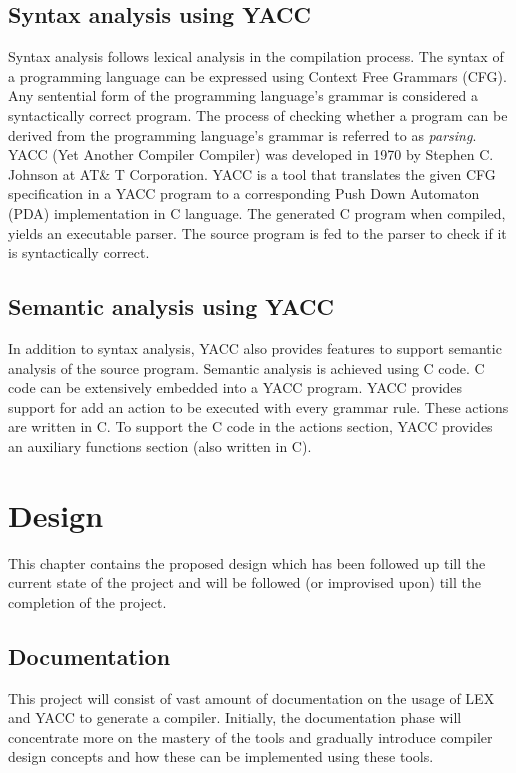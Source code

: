 \section{Syntax analysis using YACC}
Syntax analysis follows lexical analysis in the compilation process. The syntax of a programming language can be expressed using Context Free Grammars (CFG). Any sentential form of the programming language's grammar is considered a syntactically correct program. The process of checking whether a program can be derived from the programming language's grammar is referred to as \textit{parsing}. 
YACC (Yet Another Compiler Compiler) was developed in 1970 by Stephen C. Johnson at AT\& T  Corporation. YACC is a tool that translates the given CFG specification in a YACC program to a corresponding Push Down Automaton (PDA) implementation in C language. The generated C program when compiled, yields an executable parser. The source program is fed to the parser to check if it is syntactically correct.
 
\section{Semantic analysis using YACC}
In addition to syntax analysis, YACC also provides features to support semantic analysis of the source program. Semantic analysis is achieved using C code. C code can be extensively embedded into a YACC program. YACC provides support for add an action to be executed with every grammar rule. These actions are written in C. To support the C code in the actions section, YACC provides an auxiliary functions section (also written in C).

\chapter{Design}

This chapter contains the proposed design which has been followed up till the current state of the project and will be followed (or improvised upon) till the completion of the project.

\section{Documentation}

This project will consist of vast amount of documentation on the usage of LEX and YACC to generate a compiler. Initially, the documentation phase will concentrate more on the mastery of the tools and gradually introduce compiler design concepts and how these can be implemented using these tools.

